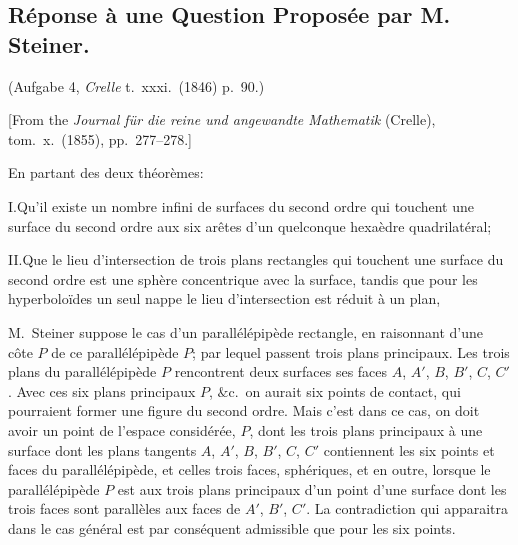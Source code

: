 \documentclass[11pt,a4paper]{article}
\begin{document}
\subsection*{R\'eponse \`a une Question Propos\'ee par M. Steiner.}


(Aufgabe 4, \textit{Crelle} t.\ xxxi.\ (1846) p.\ 90.)

\medskip

[From the \textit{Journal f\"ur die reine und angewandte Mathematik} (Crelle), tom.\ x.\ (1855), pp.\ 277--278.]

\medskip

En partant des deux th\'eor\`emes:

\medskip

I.\quad Qu'il existe un nombre infini de surfaces du second ordre qui touchent une surface du second ordre aux six ar\^etes d'un quelconque hexa\`edre quadrilat\'eral;

\medskip

II.\quad Que le lieu d'intersection de trois plans rectangles qui touchent une surface du second ordre est une sph\`ere concentrique avec la surface, tandis que pour les hyperbolo\"ides un seul nappe le lieu d'intersection est r\'eduit \`a un plan,

\medskip

M.\ Steiner suppose le cas d'un parall\'el\'epip\`ede rectangle, en raisonnant d'une c\^ote $P$ de ce parall\'el\'epip\`ede $P$; par lequel passent trois plans principaux. Les trois plans du parall\'el\'epip\`ede $P$ rencontrent deux surfaces ses faces $A$, $A'$, $B$, $B'$, $C$, $C'$. Avec ces six plans principaux $P$, $\&$c.\ on aurait six points de contact, qui pourraient former une figure du second ordre. Mais c'est dans ce cas, on doit avoir un point de l'espace consid\'er\'ee, $P$, dont les trois plans principaux \`a une surface dont les plans tangents $A$, $A'$, $B$, $B'$, $C$, $C'$ contiennent les six points et faces du parall\'el\'epip\`ede, et celles trois faces, sph\'eriques, et en outre, lorsque le parall\'el\'epip\`ede $P$ est aux trois plans principaux d'un point d'une surface dont les trois faces sont parall\`eles aux faces de $A'$, $B'$, $C'$. La contradiction qui apparaitra dans le cas g\'en\'eral est par cons\'equent admissible que pour les six points.

\medskip
\end{document}
